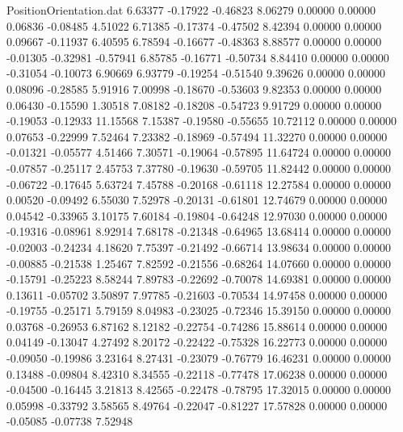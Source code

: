 \begin{filecontents}{PositionOrientation.dat}
   6.63377   -0.17922   -0.46823     8.06279    0.00000    0.00000    0.06836   -0.08485    4.51022
   6.71385   -0.17374   -0.47502     8.42394    0.00000    0.00000    0.09667   -0.11937    6.40595
   6.78594   -0.16677   -0.48363     8.88577    0.00000    0.00000   -0.01305   -0.32981   -0.57941
   6.85785   -0.16771   -0.50734     8.84410    0.00000    0.00000   -0.31054   -0.10073    6.90669
   6.93779   -0.19254   -0.51540     9.39626    0.00000    0.00000    0.08096   -0.28585    5.91916
   7.00998   -0.18670   -0.53603     9.82353    0.00000    0.00000    0.06430   -0.15590    1.30518
   7.08182   -0.18208   -0.54723     9.91729    0.00000    0.00000   -0.19053   -0.12933   11.15568
   7.15387   -0.19580   -0.55655    10.72112    0.00000    0.00000    0.07653   -0.22999    7.52464
   7.23382   -0.18969   -0.57494    11.32270    0.00000    0.00000   -0.01321   -0.05577    4.51466
   7.30571   -0.19064   -0.57895    11.64724    0.00000    0.00000   -0.07857   -0.25117    2.45753
   7.37780   -0.19630   -0.59705    11.82442    0.00000    0.00000   -0.06722   -0.17645    5.63724
   7.45788   -0.20168   -0.61118    12.27584    0.00000    0.00000    0.00520   -0.09492    6.55030
   7.52978   -0.20131   -0.61801    12.74679    0.00000    0.00000    0.04542   -0.33965    3.10175
   7.60184   -0.19804   -0.64248    12.97030    0.00000    0.00000   -0.19316   -0.08961    8.92914
   7.68178   -0.21348   -0.64965    13.68414    0.00000    0.00000   -0.02003   -0.24234    4.18620
   7.75397   -0.21492   -0.66714    13.98634    0.00000    0.00000   -0.00885   -0.21538    1.25467
   7.82592   -0.21556   -0.68264    14.07660    0.00000    0.00000   -0.15791   -0.25223    8.58244
   7.89783   -0.22692   -0.70078    14.69381    0.00000    0.00000    0.13611   -0.05702    3.50897
   7.97785   -0.21603   -0.70534    14.97458    0.00000    0.00000   -0.19755   -0.25171    5.79159
   8.04983   -0.23025   -0.72346    15.39150    0.00000    0.00000    0.03768   -0.26953    6.87162
   8.12182   -0.22754   -0.74286    15.88614    0.00000    0.00000    0.04149   -0.13047    4.27492
   8.20172   -0.22422   -0.75328    16.22773    0.00000    0.00000   -0.09050   -0.19986    3.23164
   8.27431   -0.23079   -0.76779    16.46231    0.00000    0.00000    0.13488   -0.09804    8.42310
   8.34555   -0.22118   -0.77478    17.06238    0.00000    0.00000   -0.04500   -0.16445    3.21813
   8.42565   -0.22478   -0.78795    17.32015    0.00000    0.00000    0.05998   -0.33792    3.58565
   8.49764   -0.22047   -0.81227    17.57828    0.00000    0.00000   -0.05085   -0.07738    7.52948

\end{filecontents}
